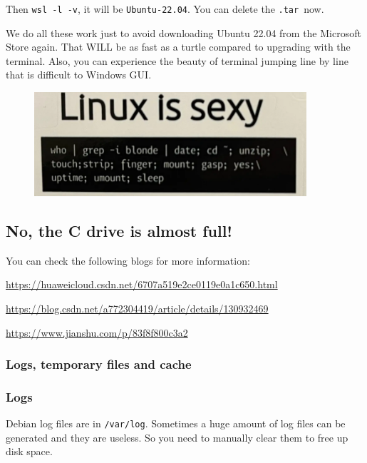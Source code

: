 \documentclass[12pt]{ctexart}
\newenvironment{mdquote}
{%
  \par\noindent
  \begin{list}{}{%
      \setlength{\leftmargin}{1em}%
      \setlength{\rightmargin}{0pt}%
      \setlength{\itemindent}{0pt}%
      \setlength{\listparindent}{\parindent}%
      \setlength{\topsep}{0.5\baselineskip}%
  }
  \item[\textbf{>}\ ]\itshape
}
{\end{list}\par}
\begin{document}
Then \texttt{wsl\ -l\ -v}, it will be \texttt{Ubuntu-22.04}. You can
delete the \texttt{.tar}\ now.

We do all these work just to avoid downloading Ubuntu 22.04 from the
Microsoft Store again. That WILL be as fast as a turtle compared to
upgrading with the terminal. Also, you can experience the beauty of
terminal jumping line by line that is difficult to Windows GUI.

\begin{figure}[H]
    \centering
    \includegraphics[width=0.9\textwidth,keepaspectratio]{assets/Linux/2.3 I upgraded alone/6.png}
\end{figure}

\newpage
\subsection{\textbf{No, the C drive is almost full!}}

\begin{mdquote}
You can check the following blogs for more information:

\url{https://huaweicloud.csdn.net/6707a519e2ce0119e0a1c650.html}

\url{https://blog.csdn.net/a772304419/article/details/130932469}

\url{https://www.jianshu.com/p/83f8f800c3a2}
\end{mdquote}

\subsubsection{\textbf{Logs, temporary files and cache}}

\subsubsection*{\textbf{Logs}}

Debian log files are in \texttt{/var/log}. Sometimes a huge amount of
log files can be generated and they are useless. So you need to manually
clear them to free up disk space.
\end{document}
